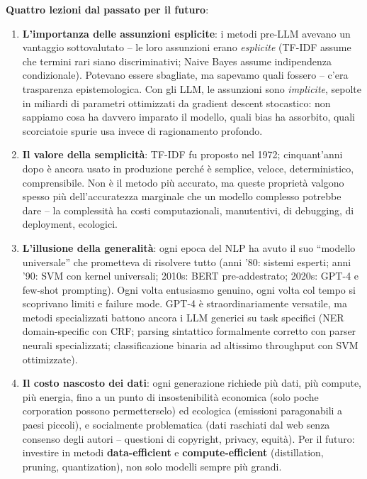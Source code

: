 \documentclass[12pt,a4paper]{article}
\begin{document}
\textbf{Quattro lezioni dal passato per il futuro}:
\begin{enumerate}
  \item \textbf{L'importanza delle assunzioni esplicite}: i metodi pre-LLM avevano un vantaggio sottovalutato -- le loro assunzioni erano \emph{esplicite} (TF-IDF assume che termini rari siano discriminativi; Naive Bayes assume indipendenza condizionale). Potevano essere sbagliate, ma sapevamo quali fossero -- c'era trasparenza epistemologica. Con gli LLM, le assunzioni sono \emph{implicite}, sepolte in miliardi di parametri ottimizzati da gradient descent stocastico: non sappiamo cosa ha davvero imparato il modello, quali bias ha assorbito, quali scorciatoie spurie usa invece di ragionamento profondo.
  \item \textbf{Il valore della semplicit\`a}: TF-IDF fu proposto nel 1972; cinquant'anni dopo \`e ancora usato in produzione perch\'e \`e semplice, veloce, deterministico, comprensibile. Non \`e il metodo pi\`u accurato, ma queste propriet\`a valgono spesso pi\`u dell'accuratezza marginale che un modello complesso potrebbe dare -- la complessit\`a ha costi computazionali, manutentivi, di debugging, di deployment, ecologici.
  \item \textbf{L'illusione della generalit\`a}: ogni epoca del NLP ha avuto il suo ``modello universale'' che prometteva di risolvere tutto (anni '80: sistemi esperti; anni '90: SVM con kernel universali; 2010s: BERT pre-addestrato; 2020s: GPT-4 e few-shot prompting). Ogni volta entusiasmo genuino, ogni volta col tempo si scoprivano limiti e failure mode. GPT-4 \`e straordinariamente versatile, ma metodi specializzati battono ancora i LLM generici su task specifici (NER domain-specific con CRF; parsing sintattico formalmente corretto con parser neurali specializzati; classificazione binaria ad altissimo throughput con SVM ottimizzate).
  \item \textbf{Il costo nascosto dei dati}: ogni generazione richiede pi\`u dati, pi\`u compute, pi\`u energia, fino a un punto di insostenibilit\`a economica (solo poche corporation possono permetterselo) ed ecologica (emissioni paragonabili a paesi piccoli), e socialmente problematica (dati raschiati dal web senza consenso degli autori -- questioni di copyright, privacy, equit\`a). Per il futuro: investire in metodi \textbf{data-efficient} e \textbf{compute-efficient} (distillation, pruning, quantization), non solo modelli sempre pi\`u grandi.
\end{enumerate}
\end{document}
